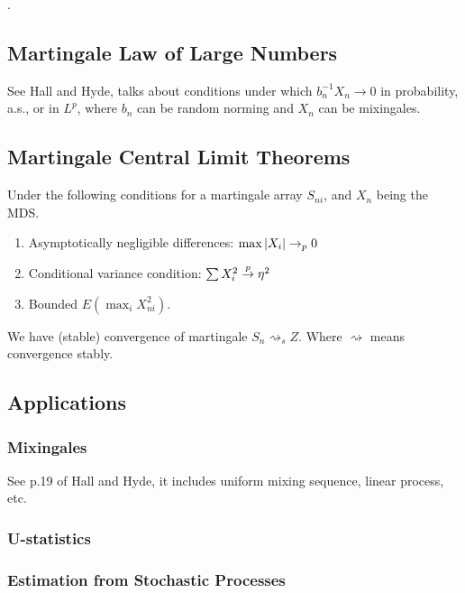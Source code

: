 . 
\begin{thm}
    
\end{thm}

\subsection{Martingale Law of Large Numbers}
See Hall and Hyde, talks about conditions under which \(b_{n}^{-1} X_{n} \to 0\)  in probability, a.s., or in \(L^{p}\), where \(b_{n}\) can be random norming and \(X_{n}\) can be mixingales. 

\subsection{Martingale Central Limit Theorems}

\begin{thm}
    Under the following conditions for a martingale array \(S_{ni}\), and \(X_{n}\) being the MDS. 
    \begin{enumerate}
        \item Asymptotically negligible differences: \(\max \abs{X_{i}} \to_{p} 0\)
        \item Conditional variance condition: \(\sum X_{i}^{2} \stackrel{p}{\to} \eta^{2}\)
        \item Bounded \(E(\max_{i} X_{ni}^{2})\). 
    \end{enumerate}
    We have (stable) convergence of martingale \(S_{n} \rightsquigarrow_{s} Z\). Where \(\rightsquigarrow \) means convergence stably. 
\end{thm}

\subsection{Applications}

\subsubsection{Mixingales}
See p.19 of Hall and Hyde, it includes uniform mixing sequence, linear process, etc. 

\subsubsection{U-statistics}

\subsubsection{Estimation from Stochastic Processes}
